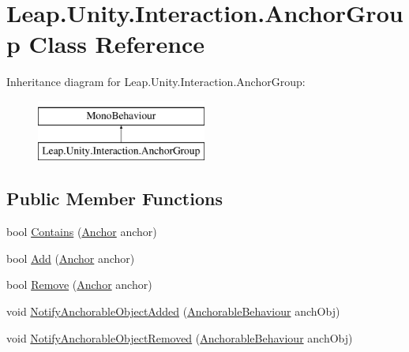 \hypertarget{class_leap_1_1_unity_1_1_interaction_1_1_anchor_group}{}\section{Leap.\+Unity.\+Interaction.\+Anchor\+Group Class Reference}
\label{class_leap_1_1_unity_1_1_interaction_1_1_anchor_group}
Inheritance diagram for Leap.\+Unity.\+Interaction.\+Anchor\+Group\+:\begin{figure}[H]
\begin{center}
\leavevmode
\includegraphics[height=2.000000cm]{class_leap_1_1_unity_1_1_interaction_1_1_anchor_group}
\end{center}
\end{figure}
\subsection*{Public Member Functions}
\begin{DoxyCompactItemize}
\item 
bool \mbox{\hyperlink{class_leap_1_1_unity_1_1_interaction_1_1_anchor_group_a8a1125abd6cbd8bb0083b9fe8ecf4fdc}{Contains}} (\mbox{\hyperlink{class_leap_1_1_unity_1_1_interaction_1_1_anchor}{Anchor}} anchor)
\item 
bool \mbox{\hyperlink{class_leap_1_1_unity_1_1_interaction_1_1_anchor_group_a83cf6387f2a3c2602086d4aeec301119}{Add}} (\mbox{\hyperlink{class_leap_1_1_unity_1_1_interaction_1_1_anchor}{Anchor}} anchor)
\item 
bool \mbox{\hyperlink{class_leap_1_1_unity_1_1_interaction_1_1_anchor_group_acf444bb0991255832bb82f5d74f5acf5}{Remove}} (\mbox{\hyperlink{class_leap_1_1_unity_1_1_interaction_1_1_anchor}{Anchor}} anchor)
\item 
void \mbox{\hyperlink{class_leap_1_1_unity_1_1_interaction_1_1_anchor_group_a1f681a3c9b69d0e472e6ca2369103f5d}{Notify\+Anchorable\+Object\+Added}} (\mbox{\hyperlink{class_leap_1_1_unity_1_1_interaction_1_1_anchorable_behaviour}{Anchorable\+Behaviour}} anch\+Obj)
\item 
void \mbox{\hyperlink{class_leap_1_1_unity_1_1_interaction_1_1_anchor_group_a76fd6cba4f8581ac74f37c8ce19bed52}{Notify\+Anchorable\+Object\+Removed}} (\mbox{\hyperlink{class_leap_1_1_unity_1_1_interaction_1_1_anchorable_behaviour}{Anchorable\+Behaviour}} anch\+Obj)
\end{DoxyCompactItemize}
